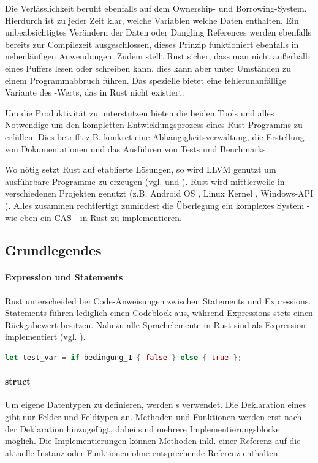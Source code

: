 \documentclass[11pt,a4paper, ngerman]{article}
\begin{document}
Die Verlässlichkeit beruht ebenfalls auf dem Ownership- und Borrowing-System. Hierdurch ist zu jeder Zeit klar, welche Variablen welche Daten enthalten. Ein unbeabsichtigtes Verändern der Daten oder Dangling References werden ebenfalls bereits zur Compilezeit ausgeschlossen, dieses Prinzip funktioniert ebenfalls in nebenläufigen Anwendungen. Zudem stellt Rust sicher, dass man nicht außerhalb eines Puffers lesen oder schreiben kann, dies kann aber unter Umständen zu einem Programmabbruch führen. Das spezielle   bietet eine fehlerunanfällige Variante des -Werts, das in Rust nicht existiert.

Um die Produktivität zu unterstützen bieten die beiden Tools  und  alles Notwendige um den kompletten Entwicklungsprozess eines Rust-Programms zu erfüllen. Dies betrifft z.B. konkret eine Abhängigkeitsverwaltung, die Erstellung von Dokumentationen und das Ausführen von Tests und Benchmarks.

Wo nötig setzt Rust auf etablierte Lösungen, so wird LLVM genutzt um ausführbare Programme zu erzeugen (vgl. \cite{RustcCodegen2} und \cite{RustcCodegen}). Rust wird mittlerweile in verschiedenen Projekten genutzt (z.B. Android OS \cite{GoogleExample}, Linux Kernel \cite{LinuxExample}, Windows-API \cite{WindowsRust}). Alles zusammen rechtfertigt zumindest die Überlegung ein komplexes System - wie eben ein CAS - in Rust zu implementieren.

\subsection{Grundlegendes}
\paragraph{Expression und Statements} Rust unterscheided bei Code-Anweisungen zwischen Statements und Expressions. Statements führen lediglich einen Codeblock aus, während Expressions stets einen Rückgabewert besitzen. Nahezu alle Sprachelemente in Rust sind als Expression implementiert (vgl. \cite[S. 122 ff.]{BO18}).

\begin{lstlisting}[language=rust, caption={Expression Einführendes Beispiel:}]
    let test_var = if bedingung_1 { false } else { true };
\end{lstlisting}

\paragraph{struct} Um eigene Datentypen zu definieren, werden s verwendet. Die Deklaration eines  gibt nur Felder und Feldtypen an. Methoden und Funktionen werden erst nach der Deklaration hinzugefügt, dabei sind mehrere Implementierungsblöcke möglich. Die Implementierungen können Methoden inkl. einer Referenz auf die aktuelle Instanz oder Funktionen ohne entsprechende Referenz enthalten.
\end{document}
